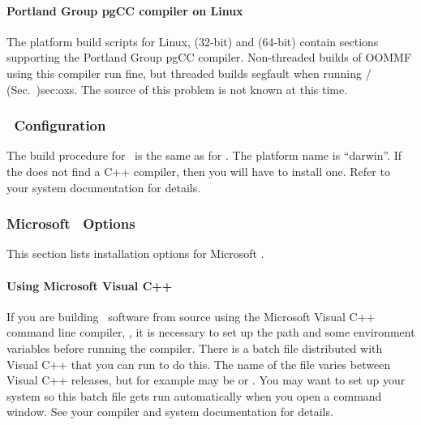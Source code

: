 \paragraph{Portland Group pgCC compiler on Linux}
The platform build scripts for Linux,
 (32-bit) and
 (64-bit) contain sections
supporting the Portland Group pgCC compiler.  Non-threaded builds of
OOMMF using this compiler run fine, but threaded builds segfault when
running  {/
 (Sec.~}{)}{sec:oxs}.  The source of this problem is not known at this
time.


\subsubsection{\MacOSX\ Configuration}\label{sec:install.macosx}
The build procedure for \MacOSX\ is the same as for \Unix.  The
platform name is ``darwin''.  If the  does not find a C++ compiler,
then you will have to install one.  Refer to your system documentation
for details.

\subsubsection{Microsoft \Windows\ Options}\label{sec:install.windows}

This section lists installation options for Microsoft \Windows.

\paragraph{Using Microsoft Visual C++}
If you are building \OOMMF\ software from source using the Microsoft
Visual C++ command line compiler, , it is necessary to set up
the path and some environment variables before running the compiler.
There is a batch file distributed with Visual C++ that you can run to do
this.  The name of the file varies between Visual C++ releases, but for
example may be  or .  You may want to
set up your system so this batch file gets run automatically when you
open a command window.  See your compiler and system documentation for
details.

